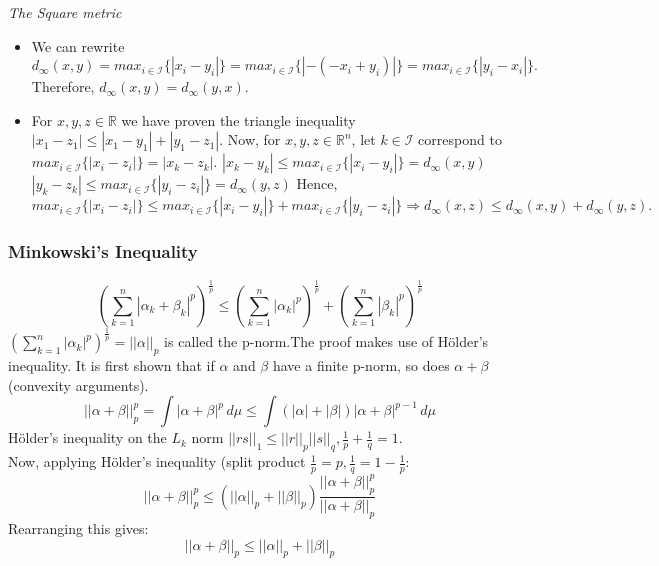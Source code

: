 \begin{frame}
\textit{The Square metric}\hfill\break
\begin{itemize}
    \item We can rewrite $d_{\infty}(x,y) = max_{i\in \mathcal{I}}\{|x_i -
    y_i|\} = max_{i\in \mathcal{I}}\{|- (- x_i + y_i)|\} = max_{i\in \mathcal{I}}\{|y_i - x_i|\}.$
    Therefore, $d_{\infty}(x,y) = d_{\infty}(y,x).$ \hfill\break
    \pause
    \item For $x,y,z \in \mathbb{R}$ we have proven the triangle inequality $|x_1 - z_1| \leq |x_1 - y_1| + |y_1 - z_1|$.  \hfill\break
    \hfill\break
     Now, for $x,y,z \in \mathbb{R}^n$, let $k \in \mathcal{I}$ correspond to $max_{i\in \mathcal{I}}\{|x_i - z_i|\} = |x_k - z_k|.$ \hfill\break
     \hfill\break
    $ |x_k - y_k| \leq max_{i\in \mathcal{I}}\{|x_i - y_i|\} = d_{\infty}(x,y)$
     \\
     $ |y_k - z_k| \leq max_{i\in \mathcal{I}}\{|y_i - z_i|\} = d_{\infty}(y,z)$
     \hfill\break
     \hfill\break
     Hence, $ max_{i\in \mathcal{I}}\{|x_i -
    z_i|\} \leq max_{i\in \mathcal{I}}\{|x_i - y_i|\} + max_{i\in \mathcal{I}}\{|y_i - z_i|\} \Rightarrow d_\infty(x,z) \leq d_\infty(x,y)+d_\infty(y,z).$
\end{itemize}
\end{frame}

\begin{frame}
\frametitle{Minkowski's Inequality}
\begin{equation*}
    (\sum_{k=1}^{n}|\alpha_k+\beta_k|^p)^\frac{1}{p} \leq (\sum_{k=1}^{n}|\alpha_k|^p)^\frac{1}{p} + (\sum_{k=1}^{n}|\beta_k|^p)^\frac{1}{p}
\end{equation*}
$(\sum_{k=1}^{n}|\alpha_k|^p)^\frac{1}{p} = ||\alpha||_p$ is called the
p-norm.The proof makes use of H\"older's inequality. It is first shown that if
$\alpha$ and $\beta$ have a finite p-norm, so does $\alpha+\beta$ (convexity
arguments).
\begin{equation*}
    ||\alpha+\beta||_p^p = \int |\alpha+\beta|^p \,d\mu \leq \int (|\alpha|+|\beta|)|\alpha+\beta|^{p-1} \,d\mu
\end{equation*}
H\"older's inequality on the $L_k$ norm $||rs||_1 \leq ||r||_p||s||_q, \frac{1}{p} + \frac{1}{q} = 1$. \\
Now, applying H\"older's inequality (split product $\frac{1}{p} = p, \frac{1}{q} = 1-\frac{1}{p}$:
\begin{equation*}
||\alpha+\beta||_p^p \leq  (||\alpha||_p+||\beta||_p)\frac{||\alpha+\beta||_p^p}{||\alpha+\beta||_p}
\end{equation*}
Rearranging this gives:
\begin{equation*}
||\alpha+\beta||_p \leq  ||\alpha||_p+||\beta||_p
\end{equation*}
\end{frame}


